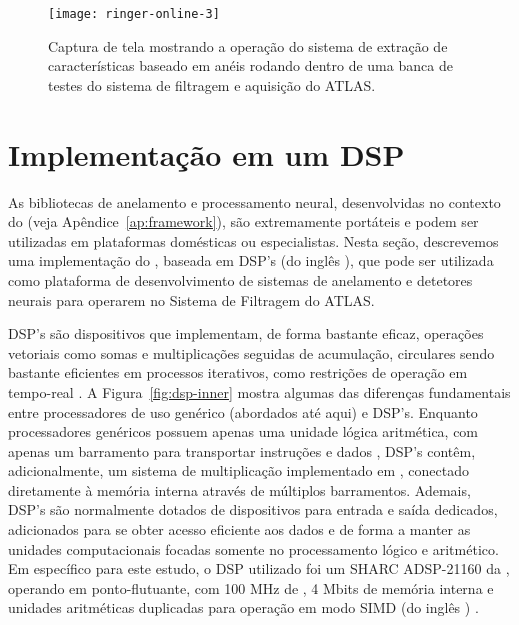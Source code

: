 \begin{figure}
\begin{center}
\texttt{[image: ringer-online-3]}
\end{center}
\caption{Captura de tela mostrando a operação do sistema de extração de
características baseado em anéis rodando dentro de uma banca de testes do
sistema de filtragem e aquisição do ATLAS.}
\label{fig:ringer-screenshot}
\end{figure}

\section{Implementação em um DSP}

As bibliotecas de anelamento e processamento neural, desenvolvidas no contexto
do  (veja Apêndice~\ref{ap:framework}), são extremamente
portáteis e podem ser utilizadas em plataformas domésticas ou
especialistas. Nesta seção, descrevemos uma implementação do
, baseada em DSP's (do inglês ), que pode ser utilizada como plataforma de desenvolvimento de
sistemas de anelamento e detetores neurais para operarem no Sistema de
Filtragem do ATLAS.

DSP's são dispositivos que implementam, de forma bastante eficaz, operações
vetoriais como somas e multiplicações seguidas de acumulação, 
circulares sendo bastante eficientes em processos iterativos, como restrições
de operação em tempo-real \cite{dsp-first}. A Figura~\ref{fig:dsp-inner}
mostra algumas das diferenças fundamentais entre processadores de uso genérico
(abordados até aqui) e DSP's. Enquanto processadores genéricos possuem apenas
uma unidade lógica aritmética, com apenas um barramento para transportar
instruções e dados \cite{rt-signal-proc}, DSP's contêm, adicionalmente, um
sistema de multiplicação implementado em , conectado diretamente
à memória interna através de múltiplos barramentos. Ademais, DSP's são
normalmente dotados de dispositivos para entrada e saída dedicados,
adicionados para se obter acesso eficiente aos dados e de forma a manter as
unidades computacionais focadas somente no processamento lógico e aritmético.
Em específico para este estudo, o DSP utilizado foi um SHARC ADSP-21160 da
, operando em ponto-flutuante, com 100 MHz de ,
4 Mbits de memória interna e unidades aritméticas duplicadas para operação em
modo SIMD (do inglês )
\cite{adsp-21160-manual}. 

